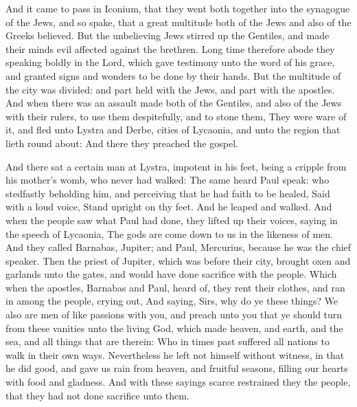  And it came to pass in Iconium, that they went both
together into the synagogue of the Jews, and so spake, that a great
multitude both of the Jews and also of the Greeks believed. 
But the unbelieving Jews stirred up the Gentiles, and made their minds
evil affected against the brethren.  Long time therefore
abode they speaking boldly in the Lord, which gave testimony unto the
word of his grace, and granted signs and wonders to be done by their
hands.  But the multitude of the city was divided: and part
held with the Jews, and part with the apostles.  And when
there was an assault made both of the Gentiles, and also of the Jews
with their rulers, to use them despitefully, and to stone them,
 They were ware of it, and fled unto Lystra and Derbe,
cities of Lycaonia, and unto the region that lieth round about:
 And there they preached the gospel.

 And there sat a certain man at Lystra, impotent in his
feet, being a cripple from his mother's womb, who never had walked:
 The same heard Paul speak: who stedfastly beholding him,
and perceiving that he had faith to be healed,  Said with a
loud voice, Stand upright on thy feet. And he leaped and walked.
 And when the people saw what Paul had done, they lifted up
their voices, saying in the speech of Lycaonia, The gods are come down
to us in the likeness of men.  And they called Barnabas,
Jupiter; and Paul, Mercurius, because he was the chief speaker.
 Then the priest of Jupiter, which was before their city,
brought oxen and garlands unto the gates, and would have done sacrifice
with the people.  Which when the apostles, Barnabas and
Paul, heard of, they rent their clothes, and ran in among the people,
crying out,  And saying, Sirs, why do ye these things? We
also are men of like passions with you, and preach unto you that ye
should turn from these vanities unto the living God, which made heaven,
and earth, and the sea, and all things that are therein: 
Who in times past suffered all nations to walk in their own ways.
 Nevertheless he left not himself without witness, in that
he did good, and gave us rain from heaven, and fruitful seasons, filling
our hearts with food and gladness.  And with these sayings
scarce restrained they the people, that they had not done sacrifice unto
them.

